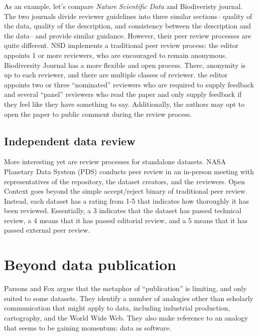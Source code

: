\documentclass[10pt,a4paper,twocolumn]{article}
\begin{document}
As an example, let's compare \emph{Nature Scientific Data} and Biodiveristy journal.
The two journals divide reviewer guidelines into three similar sections– quality of the data, quality of the description, and consistency between the description and the data– and provide similar guidance.
However, their peer review processes are quite different.
NSD implements a traditional peer review process: the editor appoints 1 or more reviewers, who are encouraged to remain anonymous.
Biodiversity Journal has a more flexible and open process.
There, anonymity is up to each reviewer, and there are multiple classes of reviewer.
the editor appoints two or three ``nominated'' reviewers who are required to supply feedback and several ``panel'' reviewers who read the paper and only supply feedback if they feel like they have something to say.
Additionally, the authors may opt to open the paper to public comment during the review process.


\subsection*{Independent data review}
More interesting yet are review processes for standalone datasets. 
NASA Planetary Data System (PDS)\cite{nasa_pds} conducts peer review in an in-person meeting with representatives of the repository, the dataset creators, and the reviewers. 
Open Context goes beyond the simple accept/reject binary of traditional peer review. 
Instead, each dataset has a rating from 1-5 that indicates how thoroughly it has been reviewed. 
Essentially, a 3 indicates that the dataset has passed technical review, a 4 means that it has passed editorial review, and a 5 means that it has passed external peer review.


\section*{Beyond data publication}\label{beyond-data-publication}

Parsons and Fox\cite{parsons_is_2013} argue that the metaphor of ``publication'' is limiting, and only suited to some datasets. 
They identify a number of analogies other than scholarly communication that might apply to data, including industrial production, cartography, and the World Wide Web.
They also make reference to an analogy that seems to be gaining momentum: data as software.\cite{schopf_treating_2012} 
\end{document}
